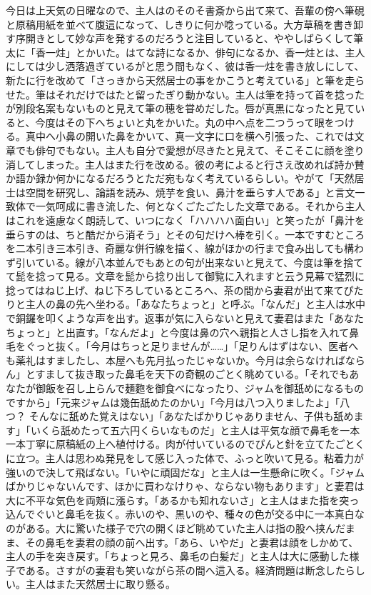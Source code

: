 \documentclass[12pt, openright]{book}
\begin{document}
今日は上天気の日曜なので、主人はのそのそ書斎から出て来て、吾輩の傍へ筆硯と原稿用紙を並べて腹這になって、しきりに何か唸っている。大方草稿を書き卸す序開きとして妙な声を発するのだろうと注目していると、ややしばらくして筆太に「香一炷」とかいた。はてな詩になるか、俳句になるか、香一炷とは、主人にしては少し洒落過ぎているがと思う間もなく、彼は香一炷を書き放しにして、新たに行を改めて「さっきから天然居士の事をかこうと考えている」と筆を走らせた。筆はそれだけではたと留ったぎり動かない。主人は筆を持って首を捻ったが別段名案もないものと見えて筆の穂を甞めだした。唇が真黒になったと見ていると、今度はその下へちょいと丸をかいた。丸の中へ点を二つうって眼をつける。真中へ小鼻の開いた鼻をかいて、真一文字に口を横へ引張った、これでは文章でも俳句でもない。主人も自分で愛想が尽きたと見えて、そこそこに顔を塗り消してしまった。主人はまた行を改める。彼の考によると行さえ改めれば詩か賛か語か録か何かになるだろうとただ宛もなく考えているらしい。やがて「天然居士は空間を研究し、論語を読み、焼芋を食い、鼻汁を垂らす人である」と言文一致体で一気呵成に書き流した、何となくごたごたした文章である。それから主人はこれを遠慮なく朗読して、いつになく「ハハハハ面白い」と笑ったが「鼻汁を垂らすのは、ちと酷だから消そう」とその句だけへ棒を引く。一本ですむところを二本引き三本引き、奇麗な併行線を描く、線がほかの行まで食み出しても構わず引いている。線が八本並んでもあとの句が出来ないと見えて、今度は筆を捨てて髭を捻って見る。文章を髭から捻り出して御覧に入れますと云う見幕で猛烈に捻ってはねじ上げ、ねじ下ろしているところへ、茶の間から妻君が出て来てぴたりと主人の鼻の先へ坐わる。「あなたちょっと」と呼ぶ。「なんだ」と主人は水中で銅鑼を叩くような声を出す。返事が気に入らないと見えて妻君はまた「あなたちょっと」と出直す。「なんだよ」と今度は鼻の穴へ親指と人さし指を入れて鼻毛をぐっと抜く。「今月はちっと足りませんが\ldots{}\ldots{}」「足りんはずはない、医者へも薬礼はすましたし、本屋へも先月払ったじゃないか。今月は余らなければならん」とすまして抜き取った鼻毛を天下の奇観のごとく眺めている。「それでもあなたが御飯を召し上らんで麺麭を御食べになったり、ジャムを御舐めになるものですから」「元来ジャムは幾缶舐めたのかい」「今月は八つ入りましたよ」「八つ？ そんなに舐めた覚えはない」「あなたばかりじゃありません、子供も舐めます」「いくら舐めたって五六円くらいなものだ」と主人は平気な顔で鼻毛を一本一本丁寧に原稿紙の上へ植付ける。肉が付いているのでぴんと針を立てたごとくに立つ。主人は思わぬ発見をして感じ入った体で、ふっと吹いて見る。粘着力が強いので決して飛ばない。「いやに頑固だな」と主人は一生懸命に吹く。「ジャムばかりじゃないんです、ほかに買わなけりゃ、ならない物もあります」と妻君は大に不平な気色を両頬に漲らす。「あるかも知れないさ」と主人はまた指を突っ込んでぐいと鼻毛を抜く。赤いのや、黒いのや、種々の色が交る中に一本真白なのがある。大に驚いた様子で穴の開くほど眺めていた主人は指の股へ挟んだまま、その鼻毛を妻君の顔の前へ出す。「あら、いやだ」と妻君は顔をしかめて、主人の手を突き戻す。「ちょっと見ろ、鼻毛の白髪だ」と主人は大に感動した様子である。さすがの妻君も笑いながら茶の間へ這入る。経済問題は断念したらしい。主人はまた天然居士に取り懸る。
\end{document}
